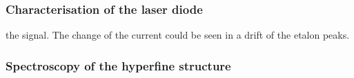 \documentclass{article}
\begin{document}
\subsubsection{Characterisation of the laser diode}
the signal. The change of the current could be seen in a drift of the etalon peaks.
\subsubsection{Spectroscopy of the hyperfine structure}
\end{document}
